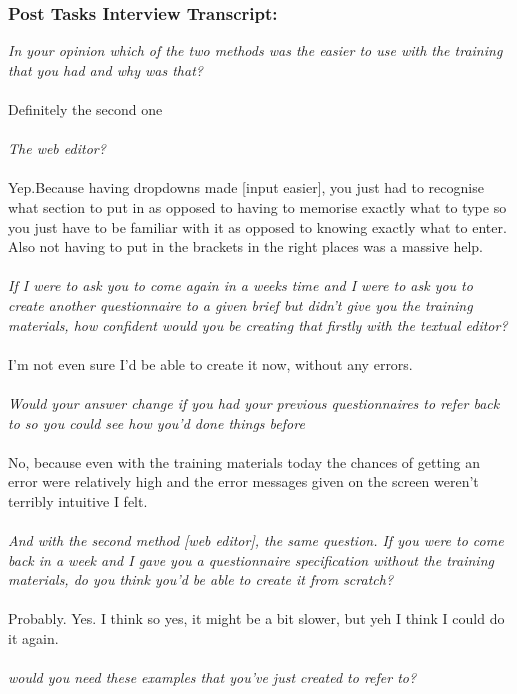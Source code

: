\subsubsection*{Post Tasks Interview Transcript:}
\textit{In your opinion which of the two methods was the easier to use with the training that you had and why was that? } \\
\\
Definitely the second one
\\
\\
\textit{The web editor?}
\\
\\
Yep.Because having dropdowns made [input easier], you just had to recognise what section to put in as opposed to having to memorise exactly what to type so you just have to be familiar with it as opposed to knowing exactly what to enter. Also not having to put in the brackets in the right places was a massive help.
\\
\\
\textit{If I were to ask you to come again in a weeks time and I were to ask you to create another questionnaire to a given brief but didn't give you the training materials, how confident would you be creating that firstly with the textual editor?}
\\
\\
I'm not even sure I'd be able to create it now, without any errors.
\\
\\
\textit{Would your answer change if you had your previous questionnaires to refer back to so you could see how you'd done things before}\\
\\
No, because even with the training materials today the chances of getting an error were relatively high and the error messages given on the screen weren't terribly intuitive I felt.
\\
\\
\textit{And with the second method [web editor], the same question. If you were to come back in a week and I gave you a questionnaire specification without the training materials, do you think you'd be able to create it from scratch?}
\\
\\
Probably. Yes. I think so yes, it might be a bit slower, but yeh I think I could do it again.
\\
\\
\textit{would you need these examples that you've just created to refer to?}

